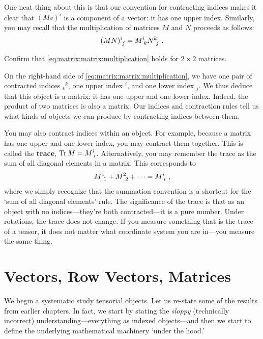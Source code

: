 \documentclass[12pt, oneside]{report}    %
\begin{document}
One neat thing about this is that our convention for contracting indices makes it clear that $(Mv)^i$ is a component of a vector: it has one upper index. Similarly, you may recall that the multiplication of matrices $M$ and $N$ proceeds as follows:
\begin{align}
 (MN)\aij{i}{j} = M\aij{i}{k}N\aij{k}{j} \ .
 \label{eq:matrix:matrix:multiplication}    
\end{align}
\begin{exercise}
Confirm that \eqref{eq:matrix:matrix:multiplication} holds for $2\times 2$ matrices.
\end{exercise}
On the right-hand side of \eqref{eq:matrix:matrix:multiplication}, we have one pair of contracted indices $_k^{\phantom{k}k}$, one upper index $^i$, and one lower index $_j$. We thus deduce that this object is a matrix: it has one upper and one lower index. Indeed, the product of two matrices is also a matrix. Our indices and contraction rules tell us what kinds of objects we can produce by contracting indices between them. 

\begin{example}
You may also contract indices within an object. For example, because a matrix has one upper and one lower index, you may contract them together. This is called the \textbf{trace}, $\Tr M = M\aij{i}{i}$. Alternatively, you may remember the trace as the sum of all diagonal elements in a matrix. This corresponds to 
\begin{align}
    M\aij{1}{1} + M\aij{2}{2} + \cdots = M\aij{i}{i} \ ,
\end{align}
where we simply recognize that the summation convention is a shortcut for the `sum of all diagonal elements' rule. The significance of the trace is that as an object with no indices---they're both contracted---it is a pure number. Under rotations, the trace does not change. If you measure something that is the trace of a tensor, it does not matter what coordinate system you are in---you measure the same thing.
\end{example}






\chapter{Vectors, Row Vectors, Matrices}
\label{ch:vectors:row:matrices:in:indices}

We begin a systematic study tensorial objects. Let us re-state some of the results from earlier chapters. In fact, we start by stating the \emph{sloppy} (technically incorrect) understanding---everything as indexed objects---and then we start to define the underlying mathematical machinery `under the hood.'
\end{document}
